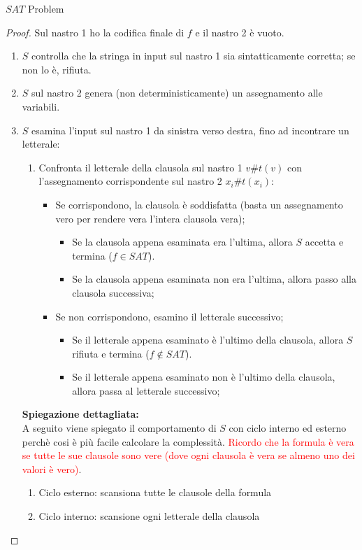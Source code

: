 \documentclass{article}  %
\theoremstyle{definition}
\begin{document}
\begin{theorem}{$SAT$ Problem}
\begin{proof}
		Sul nastro 1 ho la codifica finale di $f$ e il nastro 2 è vuoto.
		\begin{enumerate}
			\item $S$ controlla che la stringa in input sul nastro 1 sia sintatticamente corretta; se non lo è, rifiuta.
			\item $S$ sul nastro 2 genera (non deterministicamente) un assegnamento alle variabili.
			\item $S$ esamina l'input sul nastro 1 da sinistra verso destra, fino ad incontrare un letterale:
			      \begin{enumerate}
				      \item Confronta il letterale della clausola sul nastro 1 $v\#t(v)$ con l'assegnamento corrispondente sul nastro 2 $x_i\#t(x_i)$:
				            \begin{itemize}
					            \item Se corrispondono, la clausola è soddisfatta (basta un assegnamento vero per rendere vera l'intera clausola vera);
					                  \begin{itemize}
						                  \item Se la clausola appena esaminata era l'ultima, allora $S$ accetta e termina ($f \in SAT$).
						                  \item Se la clausola appena esaminata non era l'ultima, allora passo alla clausola successiva;
					                  \end{itemize}
					            \item Se non corrispondono, esamino il letterale successivo;
					                  \begin{itemize}
						                  \item Se il letterale appena esaminato è l'ultimo della clausola, allora $S$ rifiuta e termina ($f \notin SAT$).
						                  \item Se il letterale appena esaminato non è l'ultimo della clausola, allora passa al letterale successivo;
					                  \end{itemize}
				            \end{itemize}
			      \end{enumerate}

			      \textbf{Spiegazione dettagliata:} \\
			      A seguito viene spiegato il comportamento di $S$ con ciclo interno ed esterno perchè cosi è più facile calcolare la complessità.
			      \textcolor{red}{Ricordo che la formula è vera se tutte le sue clausole sono vere (dove ogni clausola è vera se almeno uno dei valori è vero)}.
			      \begin{enumerate}
				      \item Ciclo esterno: scansiona tutte le clausole della formula
				      \item Ciclo interno: scansione ogni letterale della clausola
			      \end{enumerate}


\end{enumerate}
\end{proof}
\end{theorem}
\end{document}
